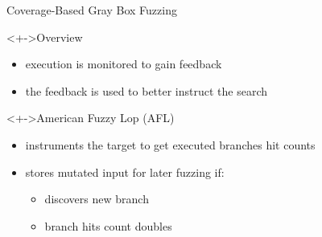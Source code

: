 \documentclass[\HandoutMode,table]{beamer}
\begin{document}
\begin{frame}
    {Coverage-Based Gray Box Fuzzing}
    \begin{block}<+->{Overview}
        \begin{itemize}
            \item{} execution is monitored to gain \alert{feedback}
            \item{} the feedback is used to better instruct the search
        \end{itemize}
    \end{block}
    \begin{exampleblock}<+->{American Fuzzy Lop (AFL)}
        \begin{itemize}
            \item{} instruments the target to get executed branches hit counts
            \item{} stores mutated input for later fuzzing if:
                \begin{itemize}
                    \item{} discovers new branch
                    \item{} branch hits count doubles
                \end{itemize}
        \end{itemize}
    \end{exampleblock}
\end{frame}
\end{document}
